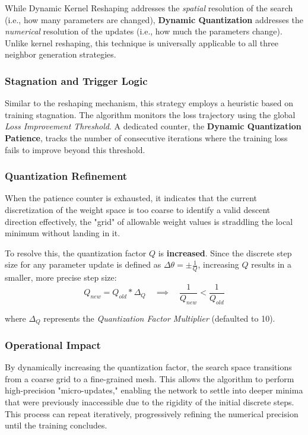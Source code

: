 While Dynamic Kernel Reshaping addresses the \textit{spatial} resolution of the search (i.e., how many parameters are changed), \textbf{Dynamic Quantization} addresses the \textit{numerical} resolution of the updates (i.e., how much the parameters change). Unlike kernel reshaping, this technique is universally applicable to all three neighbor generation strategies.

\subsubsection{Stagnation and Trigger Logic}
Similar to the reshaping mechanism, this strategy employs a heuristic based on training stagnation. The algorithm monitors the loss trajectory using the global \textit{Loss Improvement Threshold}. A dedicated counter, the \textbf{Dynamic Quantization Patience}, tracks the number of consecutive iterations where the training loss fails to improve beyond this threshold.

\subsubsection{Quantization Refinement}
When the patience counter is exhausted, it indicates that the current discretization of the weight space is too coarse to identify a valid descent direction effectively, the "grid" of allowable weight values is straddling the local minimum without landing in it.

To resolve this, the quantization factor $Q$ is \textbf{increased}. Since the discrete step size for any parameter update is defined as $\Delta \theta = \pm \frac{1}{Q}$, increasing $Q$ results in a smaller, more precise step size:
$$ Q_{new} = Q_{old} * \Delta_Q \quad \implies \quad \frac{1}{Q_{new}} < \frac{1}{Q_{old}} $$

where $\Delta_Q$ represents the \textit{Quantization Factor Multiplier} (defaulted to 10).

\subsubsection{Operational Impact}
By dynamically increasing the quantization factor, the search space transitions from a coarse grid to a fine-grained mesh. This allows the algorithm to perform high-precision "micro-updates," enabling the network to settle into deeper minima that were previously inaccessible due to the rigidity of the initial discrete steps. This process can repeat iteratively, progressively refining the numerical precision until the training concludes.





